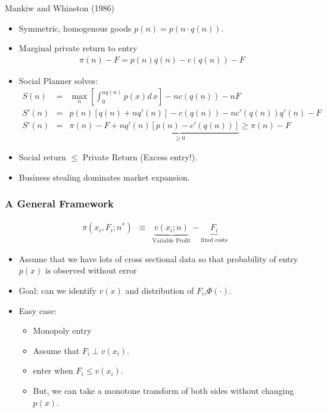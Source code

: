 \documentclass[xcolor=pdftex,dvipsnames,table,mathserif]{beamer}
\begin{document}
\begin{frame}{Mankiw and Whinston (1986)}
\begin{itemize}
\item Symmetric, homogenous goods $p(n) = p( n \cdot q(n))$.
\item Marginal private return to entry
\begin{eqnarray*}
\pi(n) - F = p(n) q(n) - c(q(n)) - F
\end{eqnarray*}
\item Social Planner solves:
\begin{eqnarray*}
S(n) &=& \max_n \left[ \int_0^{n q(n)} p(x) d\,x \right] - n c(q(n)) - nF \\
S'(n) &=&  p(n) [ q(n) + nq'(n)] - c(q(n)) - nc'(q(n)) q'(n) - F\\
S'(n) &=&  \pi(n) - F  + \underbrace{nq'(n) [p(n) - c'(q(n))] }_{\geq 0} \geq \pi(n) - F
\end{eqnarray*}
\item Social return $\leq $ Private Return (Excess entry!).
\item Business stealing dominates market expansion.
\end{itemize}
\end{frame} 

\begin{frame}
\frametitle{A General Framework}
\begin{eqnarray*}
\pi(x_i, F_i;  n^*) &\equiv& \underbrace{v(x_i;n)}_{\mbox{Variable Profit}} -\underbrace{F_i}_{\mbox{fixed costs}}
\end{eqnarray*}
\begin{itemize}
\item Assume that we have lots of cross sectional data so that probability of entry $p(x)$ is observed without error
\item Goal: can we identify $v(x)$ and distribution of $F_i$,$\Phi(\cdot)$.
\item Easy case: 
\begin{itemize}
\item Monopoly entry
\item Assume that $F_i \perp v(x_i)$.
\item enter when $F_i \leq v(x_i)$. \pause
\item But, we can take a monotone transform of both sides without changing $p(x)$.
\end{itemize}
\end{itemize}
\end{frame}
\end{document}
